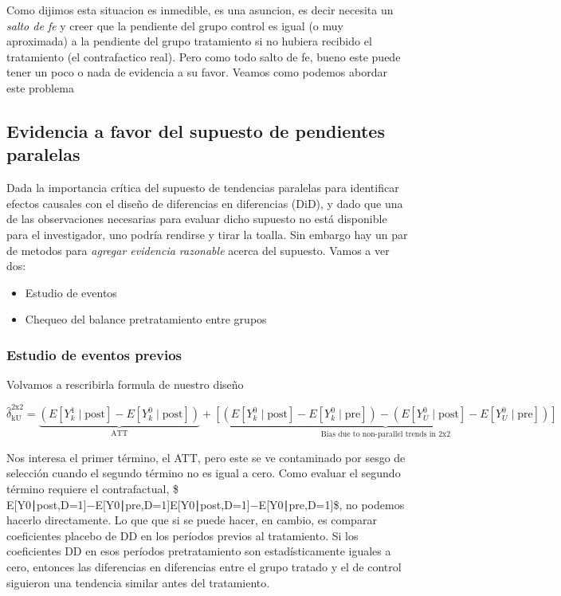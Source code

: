 \documentclass[
  letterpaper,
  DIV=11,
  numbers=noendperiod,
  oneside]{scrreprt}
\begin{document}
Como dijimos esta situacion es inmedible, es una asuncion, es decir
necesita un \emph{salto de fe} y creer que la pendiente del grupo
control es igual (o muy aproximada) a la pendiente del grupo tratamiento
si no hubiera recibido el tratamiento (el contrafactico real). Pero como
todo salto de fe, bueno este puede tener un poco o nada de evidencia a
su favor. Veamos como podemos abordar este problema

\hypertarget{evidencia-a-favor-del-supuesto-de-pendientes-paralelas}{%
\subsection{Evidencia a favor del supuesto de pendientes
paralelas}\label{evidencia-a-favor-del-supuesto-de-pendientes-paralelas}}

Dada la importancia crítica del supuesto de tendencias paralelas para
identificar efectos causales con el diseño de diferencias en diferencias
(DiD), y dado que una de las observaciones necesarias para evaluar dicho
supuesto no está disponible para el investigador, uno podría rendirse y
tirar la toalla. Sin embargo hay un par de metodos para \emph{agregar
evidencia razonable} acerca del supuesto. Vamos a ver dos:

\begin{itemize}
\item
  Estudio de eventos
\item
  Chequeo del balance pretratamiento entre grupos
\end{itemize}

\hypertarget{estudio-de-eventos-previos}{%
\subsubsection{Estudio de eventos
previos}\label{estudio-de-eventos-previos}}

Volvamos a rescribirla formula de nuestro diseño

\[
\hat{\delta}^{\text{2x2}}_{\text{kU}} = 
\underbrace{\left( E[Y^1_k \mid \text{post}] - E[Y^0_k \mid \text{post}] \right)}_{\text{ATT}} + 
\underbrace{\left[ \left( E[Y^0_k \mid \text{post}] - E[Y^0_k \mid \text{pre}] \right) - \left( E[Y^0_U \mid \text{post}] - E[Y^0_U \mid \text{pre}] \right) \right]}_{\text{Bias due to non-parallel trends in 2x2}}
\]

Nos interesa el primer término, el ATT, pero este se ve contaminado por
sesgo de selección cuando el segundo término no es igual a cero. Como
evaluar el segundo término requiere el contrafactual, \$
E{[}Y0∣post,D=1{]}−E{[}Y0∣pre,D=1{]}E{[}Y0∣post,D=1{]}−E{[}Y0∣pre,D=1{]}\$,
no podemos hacerlo directamente. Lo que que si se puede hacer, en
cambio, es comparar coeficientes placebo de DD en los períodos previos
al tratamiento. Si los coeficientes DD en esos períodos pretratamiento
son estadísticamente iguales a cero, entonces las diferencias en
diferencias entre el grupo tratado y el de control siguieron una
tendencia similar antes del tratamiento.
\end{document}
